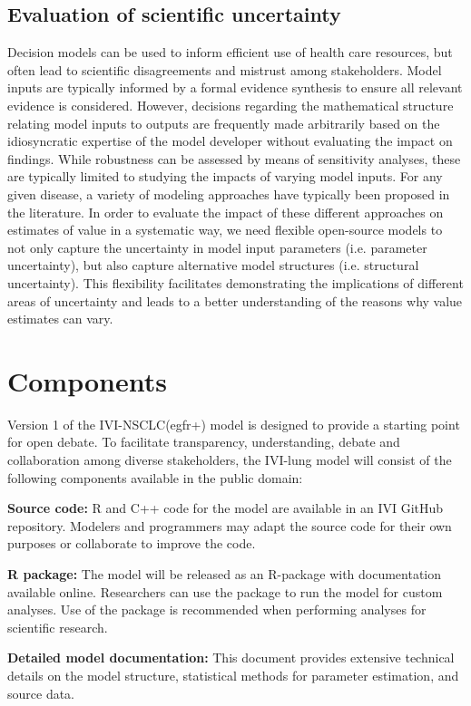 \documentclass[11pt,final,fleqn]{article}\usepackage[]{graphicx}\usepackage[]{color}
\theoremstyle{plain}
\begin{document}
{\subsection{Evaluation of scientific uncertainty}
Decision models can be used to inform efficient use of health care resources, but often lead to scientific disagreements and mistrust among stakeholders. Model inputs are typically informed by a formal evidence synthesis to ensure all relevant evidence is considered. However, decisions regarding the mathematical structure relating model inputs to outputs are frequently made arbitrarily based on the idiosyncratic expertise of the model developer without evaluating the impact on findings. While robustness can be assessed by means of sensitivity analyses, these are typically limited to studying the impacts of varying model inputs. For any given disease, a variety of modeling approaches have typically been proposed in the literature. In order to evaluate the impact of these different approaches on estimates of value in a systematic way, we need flexible open-source models to not only capture the uncertainty in model input parameters (i.e. parameter uncertainty), but also capture alternative model structures (i.e. structural uncertainty). This flexibility facilitates demonstrating the implications of different areas of uncertainty and leads to a better understanding of the reasons why value estimates can vary.

\section{Components}\label{sec:components}

Version 1 of the IVI-NSCLC(egfr+) model is designed to provide a starting point for open debate. To facilitate transparency, understanding, debate and collaboration among diverse stakeholders, the IVI-lung model will consist of the following components available in the public domain:

\textbf{Source code:} R and C++ code for the model are available in an IVI GitHub repository. Modelers and programmers may adapt the source code for their own purposes or collaborate to improve the code.

\textbf{R package:} The model will be released as an R-package with documentation available online. Researchers can use the package to run the model for custom analyses. Use of the package is recommended when performing analyses for scientific research.

\textbf{Detailed model documentation:} This document provides extensive technical details on the model structure, statistical methods for parameter estimation, and source data.

}
\end{document}
